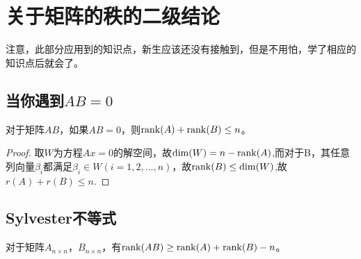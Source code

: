 \section{关于矩阵的秩的二级结论}
注意，此部分应用到的知识点，新生应该还没有接触到，但是不用怕，学了相应的知识点后就会了。
\subsection{当你遇到$AB=0$}
对于矩阵$AB$，如果$AB=0$，则${\rm rank}(A)+{\rm rank}(B)\leq n$。
\begin{proof}
	取$W$为方程$Ax=0$的解空间，故$\dim(W)=n-{\rm rank}(A)$,而对于B，其任意列向量$\beta_i$都满足$\beta_i\in W(i=1,2,...,n)$，故${\rm rank}(B)\leq \dim(W)$,故$r(A)+r(B)\leq n$.
\end{proof}
\subsection{Sylvester不等式}
对于矩阵$A_{n\times n}$，$B_{n\times n}$，有${\rm rank}(AB)\geq {\rm rank}(A)+{\rm rank}(B)-n$。

